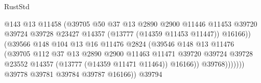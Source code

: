 \begin{lexlean}{RustStd}
\begin{coremodule}
                                            @143
                                            @13
                                            @11458
                                            (@39705
                                              @50
                                              @37
                                              @13
                                              @2890
                                              @2900
                                              @11446
                                              @11453
                                              @39720
                                              @39724
                                              @39728
                                              @23427
                                              @14357
                                              (@13777 (@14359 @11453 @11447))
                                              @16166))
                                          (@39566
                                            @148
                                            @104
                                            @13
                                            @16
                                            @11476
                                            @2824
                                            (@39546
                                              @148
                                              @13
                                              @11476
                                              (@39705
                                                @112
                                                @37
                                                @13
                                                @2890
                                                @2900
                                                @11463
                                                @11471
                                                @39720
                                                @39724
                                                @39728
                                                @23552
                                                @14357
                                                (@13777 (@14359 @11471 @11464))
                                                @16166))
                                            @39768)))))))
                              @39778
                              @39781
                              @39784
                              @39787
                              @16166))
                          @39794

\end{coremodule}
\end{lexlean}
